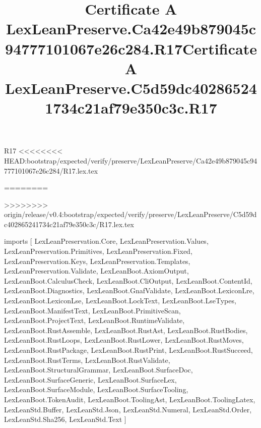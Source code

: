 \begin{lexlean}{R17}
<<<<<<<< HEAD:bootstrap/expected/verify/preserve/LexLeanPreserve/Ca42e49b879045c94777101067e26c284/R17.lex.tex
\title{Certificate A LexLeanPreserve.Ca42e49b879045c94777101067e26c284.R17}
========
\title{Certificate A LexLeanPreserve.C5d59dc402865241734c21af79e350c3c.R17}
>>>>>>>> origin/release/v0.4:bootstrap/expected/verify/preserve/LexLeanPreserve/C5d59dc402865241734c21af79e350c3c/R17.lex.tex
\begin{coremodule}
imports [
  LexLeanPreservation.Core,
  LexLeanPreservation.Values,
  LexLeanPreservation.Primitives,
  LexLeanPreservation.Fixed,
  LexLeanPreservation.Keys,
  LexLeanPreservation.Templates,
  LexLeanPreservation.Validate,
  LexLeanBoot.AxiomOutput,
  LexLeanBoot.CalculusCheck,
  LexLeanBoot.CliOutput,
  LexLeanBoot.ContentId,
  LexLeanBoot.Diagnostics,
  LexLeanBoot.GnafValidate,
  LexLeanBoot.LexiconLre,
  LexLeanBoot.LexiconLse,
  LexLeanBoot.LockText,
  LexLeanBoot.LseTypes,
  LexLeanBoot.ManifestText,
  LexLeanBoot.PrimitiveScan,
  LexLeanBoot.ProjectText,
  LexLeanBoot.RuntimeValidate,
  LexLeanBoot.RustAssemble,
  LexLeanBoot.RustAst,
  LexLeanBoot.RustBodies,
  LexLeanBoot.RustLoops,
  LexLeanBoot.RustLower,
  LexLeanBoot.RustMoves,
  LexLeanBoot.RustPackage,
  LexLeanBoot.RustPrint,
  LexLeanBoot.RustSucceed,
  LexLeanBoot.RustTerms,
  LexLeanBoot.RustValidate,
  LexLeanBoot.StructuralGrammar,
  LexLeanBoot.SurfaceDoc,
  LexLeanBoot.SurfaceGeneric,
  LexLeanBoot.SurfaceLex,
  LexLeanBoot.SurfaceModule,
  LexLeanBoot.SurfaceTooling,
  LexLeanBoot.TokenAudit,
  LexLeanBoot.ToolingAst,
  LexLeanBoot.ToolingLatex,
  LexLeanStd.Buffer,
  LexLeanStd.Json,
  LexLeanStd.Numeral,
  LexLeanStd.Order,
  LexLeanStd.Sha256,
  LexLeanStd.Text
]


\end{coremodule}
\end{lexlean}

